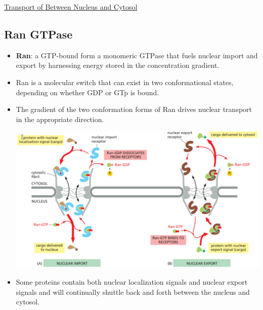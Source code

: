 \documentclass[12pt,letterpaper]{article}
\begin{document}
\begin{secbox}{\hyperlink{12}{Transport of Between Nucleus and Cytosol}}
{    \hypertarget{12.2.5}{\subsection*{Ran GTPase}}
    \begin{itemize}
        \item \textbf{Ran}: a GTP-bound form a monomeric GTPase that fuels nuclear import and export by harnessing energy stored in the concentration gradient.
        \item Ran is a molecular switch that can exist in two conformational states, depending on whether GDP or GTp is bound.
        \item The gradient of the two conformation forms of Ran drives nuclear transport in the appropriate direction.\par 
        \includegraphics[width=\linewidth]{images/fig12-13.png}
        \item Some proteins contain both nuclear localization signals and nuclear export signals and will continually shuttle back and forth between the nucleus and cytosol.
    \end{itemize}
    
}
\end{secbox}
\end{document}
